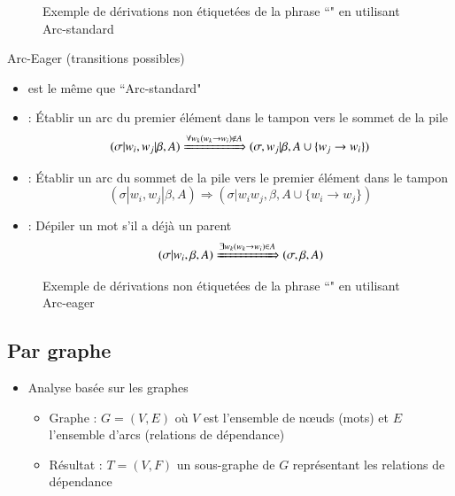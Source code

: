 \documentclass{KodeBook}
\begin{document}
\begin{figure}
	\caption{Exemple de dérivations non étiquetées de la phrase ``" en utilisant Arc-standard \cite{2018-eisenstein}}
\end{figure}

Arc-Eager (transitions possibles)

\begin{itemize}
	\item {} est le même que ``Arc-standard"
	
	\item {} : Établir un arc du premier élément dans le tampon vers le sommet de la pile
	\[ (\sigma|w_i, w_j|\beta, A) \xRightarrow{\forall w_k (w_k \rightarrow w_i) \notin A}  (\sigma, w_j|\beta, A \cup \{w_j \rightarrow w_i \}) \] 
	
	\item {} : Établir un arc du sommet de la pile vers le premier élément dans le tampon
	\[ (\sigma|w_i, w_j|\beta, A) \Rightarrow  (\sigma|w_i w_j, \beta, A \cup \{w_i \rightarrow w_j \}) \] 
	
	\item {} : Dépiler un mot s'il a déjà un parent
	\[ (\sigma|w_i, \beta, A) \xRightarrow{\exists w_k (w_k \rightarrow w_i) \in A} (\sigma, \beta, A) \] 
\end{itemize}

\begin{figure}
	\caption{Exemple de dérivations non étiquetées de la phrase ``" en utilisant Arc-eager \cite{2018-eisenstein}}
\end{figure}

\subsection{Par graphe}

\begin{minipage}{.6\textwidth}
	\begin{itemize}
		\item Analyse basée sur les graphes
		\begin{itemize}
			\item Graphe : $G = (V, E)$ où $V$ est l'ensemble de nœuds (mots) et $E$ l'ensemble d'arcs (relations de dépendance)
			\item Résultat : $T = (V, F)$ un sous-graphe de $G$ représentant les relations de dépendance
		\end{itemize}
	\end{itemize}
\end{minipage}
\begin{minipage}{.38\textwidth}
\end{minipage}
\end{document}
